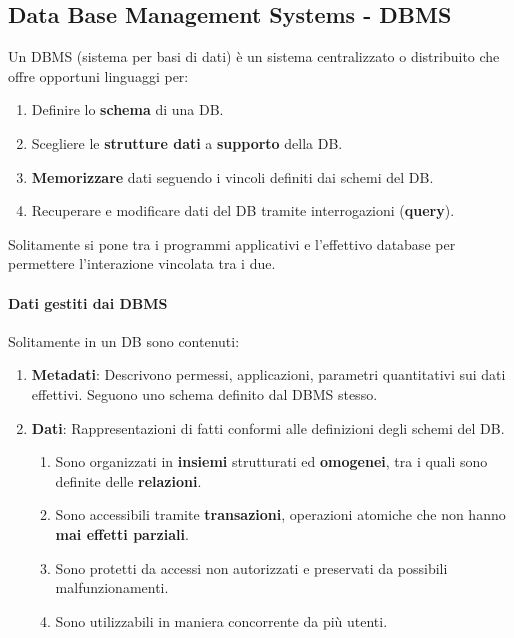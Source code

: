 \documentclass{article}
\begin{document}
\newpage

\subsection{Data Base Management Systems - DBMS}

Un DBMS (sistema per basi di dati) è un sistema centralizzato o distribuito che offre opportuni linguaggi per:

\begin{enumerate}
    \item Definire lo \textbf{schema} di una DB.
    \item Scegliere le \textbf{strutture dati} a \textbf{supporto} della DB.
    \item \textbf{Memorizzare} dati seguendo i vincoli definiti dai schemi del DB.
    \item Recuperare e modificare dati del DB tramite interrogazioni (\textbf{query}).
\end{enumerate}

Solitamente si pone tra i programmi applicativi e l'effettivo database per permettere l'interazione vincolata tra i due.

\paragraph{Dati gestiti dai DBMS}

Solitamente in un DB sono contenuti:

\begin{enumerate}
    \item \textbf{Metadati}: Descrivono permessi, applicazioni, parametri quantitativi sui dati effettivi. Seguono uno schema definito dal DBMS stesso.
    \item \textbf{Dati}: Rappresentazioni di fatti conformi alle definizioni degli schemi del DB.
    \begin{enumerate}
        \item Sono organizzati in \textbf{insiemi} strutturati ed \textbf{omogenei}, tra i quali sono definite delle \textbf{relazioni}.
        \item Sono accessibili tramite \textbf{transazioni}, operazioni atomiche che non hanno \textbf{mai effetti parziali}.
        \item Sono protetti da accessi non autorizzati e preservati da possibili malfunzionamenti.
        \item Sono utilizzabili in maniera concorrente da più utenti.
    \end{enumerate}
\end{enumerate}
\end{document}
